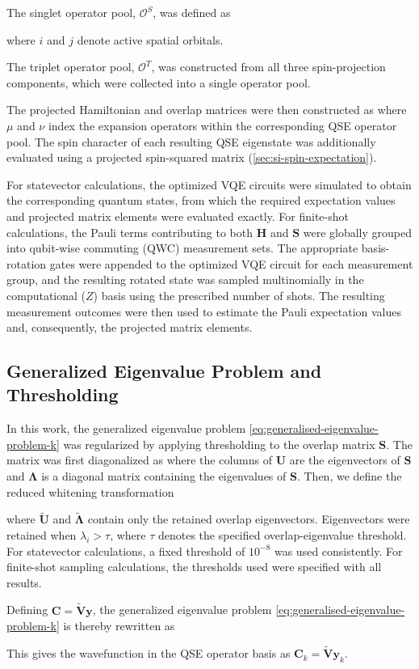 The singlet operator pool, $\mathcal{O}^{S}$, was defined as

\QSESingletOperatorPoolEquation
where $i$ and $j$ denote active spatial orbitals.

The triplet operator pool, $\mathcal{O}^{T}$, was constructed from all three spin-projection components, which were collected into a single operator pool.
\QSETripletOperatorPoolEquation

The projected Hamiltonian and overlap matrices were then constructed as 
\QSEProjectedMatricesEquation
where $\mu$ and $\nu$ index the expansion operators within the corresponding QSE operator pool. The spin character of each resulting QSE eigenstate was additionally evaluated using a projected spin-squared matrix (\cref{sec:si-spin-expectation}).

For statevector calculations, the optimized VQE circuits were simulated to obtain the corresponding quantum states, from which the required expectation values and projected matrix elements were evaluated exactly. For finite-shot calculations, the Pauli terms contributing to both $\mathbf{H}$ and $\mathbf{S}$ were globally grouped into qubit-wise commuting (QWC) measurement sets. The appropriate basis-rotation gates were appended to the optimized VQE circuit for each measurement group, and the resulting rotated state was sampled multinomially in the computational ($Z$) basis using the prescribed number of shots. The resulting measurement outcomes were then used to estimate the Pauli expectation values and, consequently, the projected matrix elements.

\subsection{Generalized Eigenvalue Problem and Thresholding}
In this work, the generalized eigenvalue problem \cref{eq:generalised-eigenvalue-problem-k} was regularized by applying thresholding to the overlap matrix $\mathbf{S}$.
The matrix was first diagonalized as
\DiagonaliseSEquation
where the columns of $\mathbf{U}$ are the eigenvectors of $\mathbf{S}$ and $\boldsymbol{\Lambda}$ is a diagonal matrix containing the eigenvalues of $\mathbf{S}$. Then, we define the reduced whitening transformation

\WhitenSEquation
where $\tilde{\mathbf{U}}$ and $\tilde{\boldsymbol{\Lambda}}$ contain only the retained overlap eigenvectors. 
Eigenvectors were retained when $\lambda_i > \tau$, where $\tau$ denotes the specified overlap-eigenvalue threshold. 
For statevector calculations, a fixed threshold of $10^{-8}$ was used consistently. For finite-shot sampling calculations, the thresholds used were specified with all results. 

Defining $\mathbf{C}=\tilde{\mathbf{V}}\mathbf{y}$, the generalized eigenvalue problem \cref{eq:generalised-eigenvalue-problem-k} is thereby rewritten as 

\ReducedEigenvalueEquation

This gives the wavefunction in the QSE operator basis as $\mathbf{C}_k=\tilde{\mathbf{V}}\mathbf{y}_k$.
